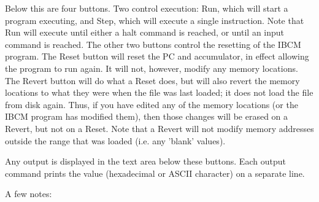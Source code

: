 Below this are four buttons. Two control execution: Run, which will
start a program executing, and Step, which will execute a single
instruction. Note that Run will execute until either a halt command is
reached, or until an input command is reached. The other two buttons
control the resetting of the IBCM program. The Reset button will reset
the PC and accumulator, in effect allowing the program to run again.
It will not, however, modify any memory locations. The Revert button
will do what a Reset does, but will also revert the memory locations
to what they were when the file was last loaded; it does not load the
file from disk again. Thus, if you have edited any of the memory
locations (or the IBCM program has modified them), then those changes
will be erased on a Revert, but not on a Reset. Note that a Revert
will not modify memory addresses outside the range that was loaded
(i.e. any 'blank' values).

Any output is displayed in the text area below these buttons. Each
output command prints the value (hexadecimal or ASCII character) on a
separate line.

A few notes:

